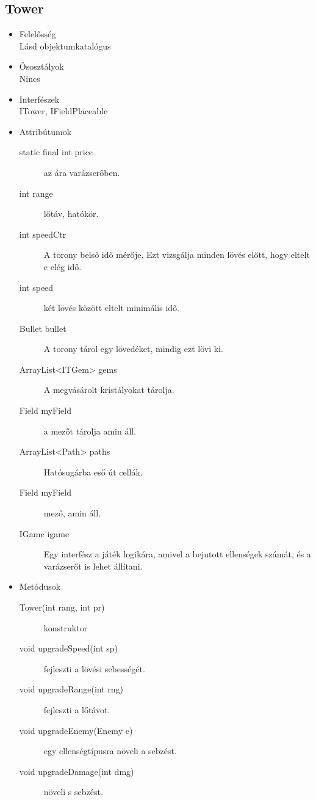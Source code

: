 \subsection{Tower}
\begin{itemize}
\item Felelősség\\
Lásd objektumkatalógus
\item Ősosztályok\\
Nincs
\item Interfészek\\
ITower, IFieldPlaceable
\item Attribútumok\\
	\begin{description}
		\item[static final int price] az ára varázserőben.
\item[int range] lőtáv, hatókör.
\item[int speedCtr] A torony belső idő mérője. Ezt vizsgálja minden lövés előtt, hogy eltelt e elég idő.
\item[int speed] két lövés között eltelt minimális idő.
\item[Bullet bullet] A torony tárol egy lövedéket, mindig ezt lövi ki.
\item[ArrayList<ITGem> gems] A megvásárolt kristályokat tárolja.
\item[Field myField] a mezőt tárolja amin áll.
\item[ArrayList<Path> paths] Hatósugárba eső út cellák.
\item[Field myField] mező, amin áll.
\item[IGame igame] Egy interfész a játék logikára, amivel a bejutott ellenségek számát, és a varázserőt is lehet állítani.

	\end{description}
\item Metódusok\\
	\begin{description}
		\item[Tower(int rang, int pr)] konstruktor
\item[void upgradeSpeed(int sp)] fejleszti a lövési sebességét.
\item[void upgradeRange(int rng)] fejleszti a lőtávot.
\item[void upgradeEnemy(Enemy e)] egy ellenségtípusra növeli a sebzést.
\item[void upgradeDamage(int dmg)] növeli s sebzést.

		
		
	\end{description}
\end{itemize}
